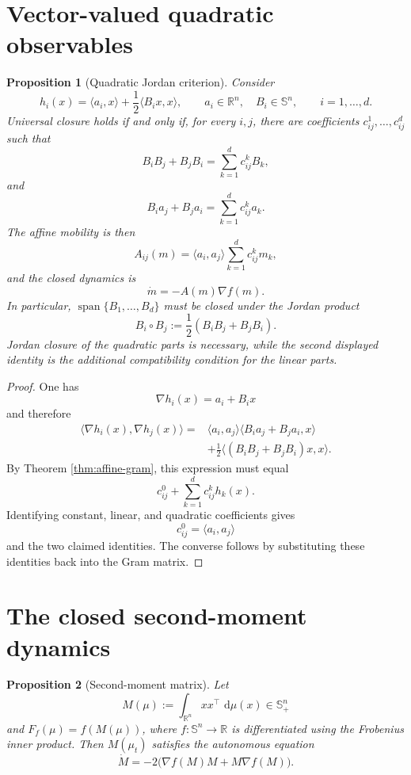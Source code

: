 \documentclass[11pt]{article}
\newcommand{\R}{\mathbb R}
\newcommand{\Sym}{\mathbb S}
\newcommand{\dd}{\,\mathrm d}
\newtheorem{proposition}{Proposition}
\theoremstyle{remark}
\begin{document}
\section{Vector-valued quadratic observables}

\begin{proposition}[Quadratic Jordan criterion]
\label{prop:vector-quadratic}
Consider
\[
  h_i(x)
  =
  \langle a_i,x\rangle+\frac12\langle B_i x,x\rangle,
  \qquad
  a_i\in\R^n,\quad B_i\in\Sym^n,
  \qquad i=1,\ldots,d.
\]
Universal closure holds if and only if, for every \(i,j\), there are
coefficients \(c_{ij}^1,\ldots,c_{ij}^d\) such that
\[
  \boxed{
  B_iB_j+B_jB_i
  =
  \sum_{k=1}^d c_{ij}^kB_k,
  }
\]
and
\[
  \boxed{
  B_i a_j+B_j a_i
  =
  \sum_{k=1}^d c_{ij}^k a_k.
  }
\]
The affine mobility is then
\[
  A_{ij}(m)
  =
  \langle a_i,a_j\rangle
  \sum_{k=1}^d c_{ij}^k m_k,
\]
and the closed dynamics is
\[
  \dot m=-A(m)\nabla f(m).
\]
In particular, \(\operatorname{span}\{B_1,\ldots,B_d\}\) must be closed
under the Jordan product
\[
  B_i\circ B_j:=\frac12(B_iB_j+B_jB_i).
\]
Jordan closure of the quadratic parts is necessary, while the second
displayed identity is the additional compatibility condition for the
linear parts.
\end{proposition}

\begin{proof}
One has
\[
  \nabla h_i(x)=a_i+B_ix
\]
and therefore
\[
  \begin{aligned}
  \langle\nabla h_i(x),\nabla h_j(x)\rangle
  ={}&
  \langle a_i,a_j\rangle
  \langle B_i a_j+B_j a_i,x\rangle\\
  &+
  \frac12
  \langle(B_iB_j+B_jB_i)x,x\rangle.
  \end{aligned}
\]
By Theorem \ref{thm:affine-gram}, this expression must equal
\[
  c_{ij}^0+\sum_{k=1}^d c_{ij}^k h_k(x).
\]
Identifying constant, linear, and quadratic coefficients gives
\[
  c_{ij}^0=\langle a_i,a_j\rangle
\]
and the two claimed identities.  The converse follows by substituting
these identities back into the Gram matrix.
\end{proof}

\section{The closed second-moment dynamics}

\begin{proposition}[Second-moment matrix]
\label{prop:second-moment}
Let
\[
  M(\mu):=\int_{\R^n}xx^\top\,\dd\mu(x)\in\Sym^n_+
\]
and \(F_f(\mu)=f(M(\mu))\), where
\(f:\Sym^n\to\R\) is differentiated using the Frobenius inner product.
Then \(M(\mu_t)\) satisfies the autonomous equation
\[
  \boxed{
  \dot M
  =
  -2\bigl(\nabla f(M)M+M\nabla f(M)\bigr).
  }
\]
\end{proposition}
\end{document}
